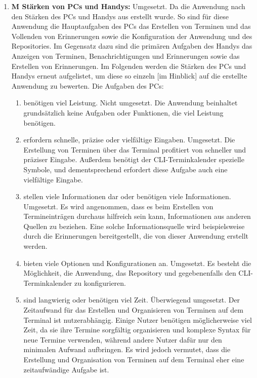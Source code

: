 \begin{enumerate}
	\item \textbf{M Stärken von PCs und Handys:}\newline%
		Umgesetzt. Da die Anwendung nach den Stärken des PCs und Handys aus  erstellt wurde. %
			So sind für diese Anwendung die Hauptaufgaben des PCs das Erstellen von Terminen und das Vollenden von Erinnerungen sowie die Konfiguration der Anwendung und des Repositories. Im Gegensatz dazu sind die primären Aufgaben des Handys das Anzeigen von Terminen, Benachrichtigungen und Erinnerungen sowie das Erstellen von Erinnerungen.\newline%
			Im Folgenden werden die Stärken des PCs und Handys erneut aufgelistet, um diese so einzeln [im Hinblick] auf die erstellte Anwendung zu bewerten.\newline%
		\myNewSection
		Die Aufgaben des PCs:%
  		\begin{enumerate}[label*={\arabic*}]
			\item benötigen viel Leistung.\newline%
				Nicht umgesetzt. Die Anwendung beinhaltet grundsätzlich keine Aufgaben oder Funktionen, die viel Leistung benötigen.%
			\item erfordern schnelle, präzise oder vielfältige Eingaben.\newline%
				Umgesetzt. Die Erstellung von Terminen über das Terminal profitiert von schneller und präziser Eingabe. Außerdem benötigt der CLI-Terminkalender spezielle Symbole, und dementsprechend erfordert diese Aufgabe auch eine vielfältige Eingabe.%
			\item stellen viele Informationen dar oder benötigen viele Informationen.\newline%
				Umgesetzt. Es wird angenommen, dass es beim Erstellen von Termineinträgen durchaus hilfreich sein kann, Informationen aus anderen Quellen zu beziehen. Eine solche Informationsquelle wird beispielsweise durch die Erinnerungen bereitgestellt, die von dieser Anwendung erstellt werden.
			\item bieten viele Optionen und Konfigurationen an.\newline%
				Umgesetzt. Es besteht die Möglichkeit, die Anwendung, das Repository und gegebenenfalls den CLI-Terminkalender zu konfigurieren.%
			\item sind langwierig oder benötigen viel Zeit.\newline%
				Überwiegend umgesetzt. Der Zeitaufwand für das Erstellen und Organisieren von Terminen auf dem Terminal ist nutzerabhängig. Einige Nutzer benötigen möglicherweise viel Zeit, da sie ihre Termine sorgfältig organisieren und komplexe Syntax für neue Termine verwenden, während andere Nutzer dafür nur den minimalen Aufwand aufbringen. Es wird jedoch vermutet, dass die Erstellung und Organisation von Terminen auf dem Terminal eher eine zeitaufwändige Aufgabe ist.%

\end{enumerate}
\end{enumerate}
